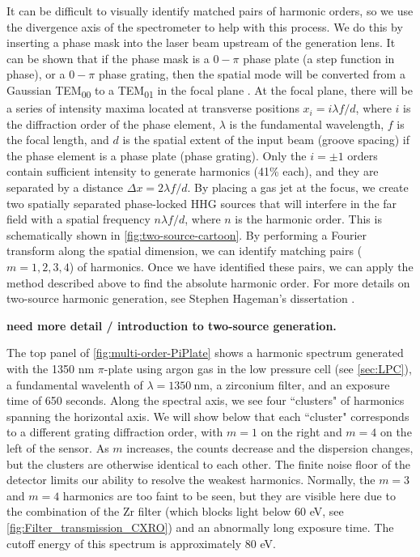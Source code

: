 It can be difficult to visually identify matched pairs of harmonic orders, so we use the divergence axis of the spectrometer to help with this process. We do this by inserting a phase mask into the laser beam upstream of the generation lens. It can be shown that if the phase mask is a $0-\pi$ phase plate (a step function in phase), or a $0-\pi$ phase grating, then the spatial mode will be converted from a Gaussian TEM\textsubscript{00} to a TEM\textsubscript{01} in the focal plane \cite{hagemanComplexAttosecondTransientAbsorption2020,camperHighRelativephasePrecision2019,camperTransverseElectromagneticMode2015,camperHighharmonicPhaseSpectroscopy2014,camperCombinedHighharmonicInterferometries2015}. At the focal plane, there will be a series of intensity maxima located at transverse positions $x_i = i \lambda f / d$, where $i$ is the diffraction order of the phase element, $\lambda$ is the fundamental wavelength, $f$ is the focal length, and $d$ is the spatial extent of the input beam (groove spacing) if the phase element is a phase plate (phase grating). Only the $i = \pm 1$ orders contain sufficient intensity to generate harmonics (41\% each), and they are separated by a distance $\Delta x = 2 \lambda f / d$. By placing a gas jet at the focus, we create two spatially separated phase-locked HHG sources that will interfere in the far field with a spatial frequency $n \lambda f/d$, where $n$ is the harmonic order. This is schematically shown in \cref{fig:two-source-cartoon}. By performing a Fourier transform along the spatial dimension, we can identify matching pairs ($m=1,2,3,4$) of harmonics. Once we have identified these pairs, we can apply the method described above to find the absolute harmonic order. For more details on two-source harmonic generation, see Stephen Hageman's dissertation \cite{hagemanComplexAttosecondTransientAbsorption2020}.

\textbf{need more detail / introduction to two-source generation.}

The top panel of \cref{fig:multi-order-PiPlate} shows a harmonic spectrum generated with the 1350 nm $\pi$-plate using argon gas in the low pressure cell (see \cref{sec:LPC}), a fundamental wavelenth of $\lambda=1350 \ \textrm{nm}$, a zirconium filter, and an exposure time of 650 seconds. Along the spectral axis, we see four ``clusters" of harmonics spanning the horizontal axis. We will show below that each ``cluster" corresponds to a different grating diffraction order, with $m=1$ on the right and $m=4$ on the left of the sensor. As $m$ increases, the counts decrease and the dispersion changes, but the clusters are otherwise identical to each other. The finite noise floor of the detector limits our ability to resolve the weakest harmonics. Normally, the $m=3$ and $m=4$ harmonics are too faint to be seen, but they are visible here due to the combination of the Zr filter (which blocks light below 60 eV, see \cref{fig:Filter_transmission_CXRO}) and an abnormally long exposure time. The cutoff energy of this spectrum is approximately 80 eV.

